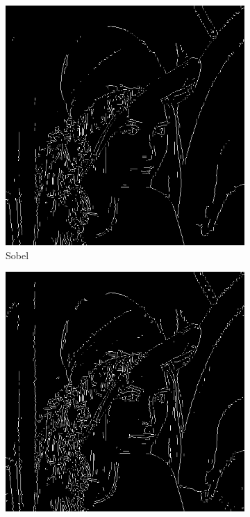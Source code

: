 \documentclass[a4paper]{article}
\begin{document}
\begin{figure}[H]
\centering
	\begin{subfigure}[t]{0.3\textwidth}
	\centering
	\includegraphics[width=\textwidth]{imagenesInforme/lenaHysteresisGaussianSobel}
	\caption{Sobel}
	\end{subfigure}
	\begin{subfigure}[t]{0.3\textwidth}
	\centering
	\includegraphics[width=\textwidth]{imagenesInforme/lenaHysteresisGaussianPrewitt}

\end{subfigure}
\end{figure}
\end{document}
